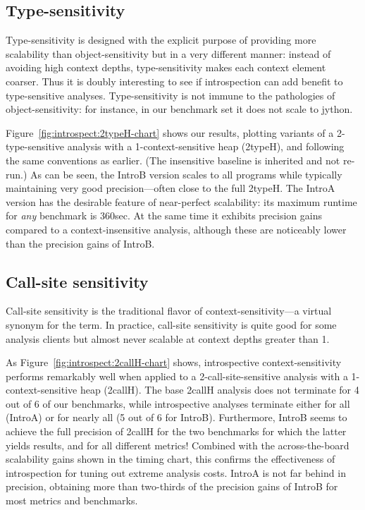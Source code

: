 \subsection{Type-sensitivity}
Type-sensitivity is designed with the explicit purpose of providing more scalability than object-sensitivity but in a very different manner: instead of avoiding high context depths, type-sensitivity makes each context element coarser. Thus it is doubly interesting to see if introspection can add benefit to type-sensitive analyses. Type-sensitivity is not immune to the pathologies of object-sensitivity: for instance, in our benchmark set it does not scale to jython. 

Figure~\ref{fig:introspect:2typeH-chart} shows our results, plotting variants of a 2-type-sensitive analysis with a 1-context-sensitive heap (2typeH), and following the same conventions as earlier. (The insensitive baseline is inherited and not re-run.) As can be seen, the IntroB version scales to all programs while typically maintaining very good precision---often close to the full 2typeH. The IntroA version has the desirable feature of near-perfect scalability: its maximum runtime for \emph{any} benchmark is 360sec. At the same time it exhibits precision gains compared to a context-insensitive analysis, although these are noticeably lower than the precision gains of IntroB.


\subsection{Call-site sensitivity}
Call-site sensitivity is the traditional flavor of context-sensitivity---a virtual synonym for the term. In practice, call-site sensitivity is quite good for some analysis clients but almost never scalable at context depths greater than 1. 

As Figure~\ref{fig:introspect:2callH-chart} shows, introspective context-sensitivity performs remarkably well when applied to a 2-call-site-sensitive analysis with a 1-context-sensitive heap (2callH). The base 2callH analysis does not terminate for 4 out of 6 of our benchmarks, while introspective analyses terminate either for all (IntroA) or for nearly all (5 out of 6 for IntroB). Furthermore, IntroB seems to achieve the full precision of 2callH for the two benchmarks for which the latter yields results, and for all different metrics! Combined with the across-the-board scalability gains shown in the timing chart, this confirms the effectiveness of introspection for tuning out extreme analysis costs. IntroA is not far behind in precision, obtaining more than two-thirds of the precision gains of IntroB for most metrics and benchmarks.


